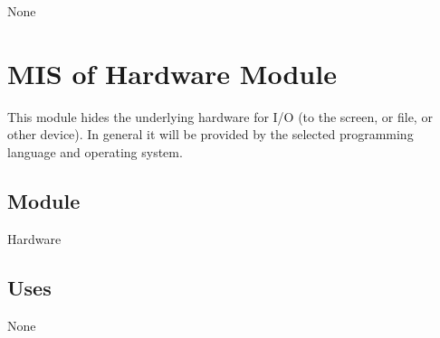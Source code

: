 \documentclass[12pt, titlepage]{article}
\begin{document}
None

\newpage


\section{MIS of Hardware Module} \label{Hardware}

This module hides the underlying hardware for I/O (to the screen, or file, or
other device).  In general it will be provided by the selected programming
language and operating system.

\subsection{Module}

Hardware

\subsection {Uses}

None
\end{document}
